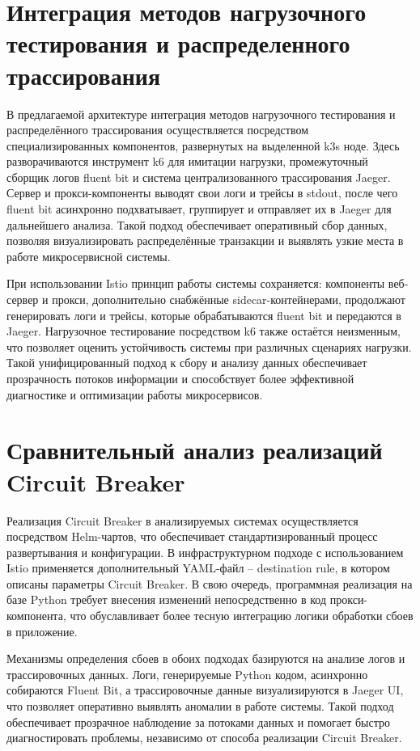   
\section{Интеграция методов нагрузочного тестирования и распределенного трассирования}
  

В предлагаемой архитектуре интеграция методов нагрузочного тестирования и распределённого трассирования осуществляется посредством специализированных компонентов, развернутых на выделенной k3s ноде. Здесь разворачиваются инструмент k6 для имитации нагрузки, промежуточный сборщик логов fluent bit и система централизованного трассирования Jaeger. Сервер и прокси-компоненты выводят свои логи и трейсы в stdout, после чего fluent bit асинхронно подхватывает, группирует и отправляет их в Jaeger для дальнейшего анализа. Такой подход обеспечивает оперативный сбор данных, позволяя визуализировать распределённые транзакции и выявлять узкие места в работе микросервисной системы.

При использовании Istio принцип работы системы сохраняется: компоненты веб-сервер и прокси, дополнительно снабжённые sidecar-контейнерами, продолжают генерировать логи и трейсы, которые обрабатываются fluent bit и передаются в Jaeger. Нагрузочное тестирование посредством k6 также остаётся неизменным, что позволяет оценить устойчивость системы при различных сценариях нагрузки. Такой унифицированный подход к сбору и анализу данных обеспечивает прозрачность потоков информации и способствует более эффективной диагностике и оптимизации работы микросервисов.
  
\section{Сравнительный анализ реализаций Circuit Breaker}
  

Реализация Circuit Breaker в анализируемых системах осуществляется посредством Helm-чартов, что обеспечивает стандартизированный процесс развертывания и конфигурации. В инфраструктурном подходе с использованием Istio применяется дополнительный YAML-файл – destination rule, в котором описаны параметры Circuit Breaker. В свою очередь, программная реализация на базе Python требует внесения изменений непосредственно в код прокси-компонента, что обуславливает более тесную интеграцию логики обработки сбоев в приложение.

Механизмы определения сбоев в обоих подходах базируются на анализе логов и трассировочных данных. Логи, генерируемые Python кодом, асинхронно собираются Fluent Bit, а трассировочные данные визуализируются в Jaeger UI, что позволяет оперативно выявлять аномалии в работе системы. Такой подход обеспечивает прозрачное наблюдение за потоками данных и помогает быстро диагностировать проблемы, независимо от способа реализации Circuit Breaker.

